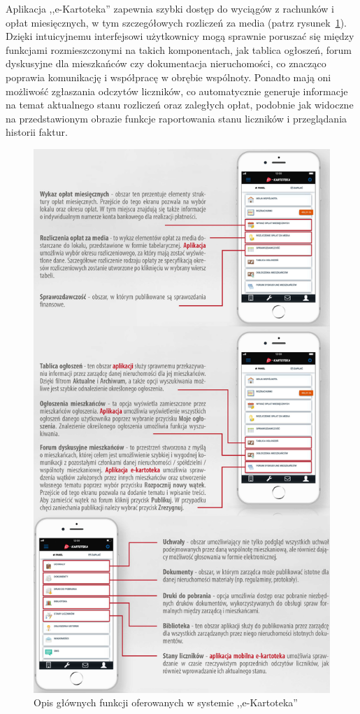 Aplikacja ,,e-Kartoteka'' zapewnia szybki dostęp do wyciągów z rachunków i opłat miesięcznych, w tym szczegółowych rozliczeń za media (patrz rysunek~\ref{fig:kartoteka_manual}). Dzięki intuicyjnemu interfejsowi użytkownicy mogą sprawnie poruszać się między funkcjami rozmieszczonymi na takich komponentach, jak tablica ogłoszeń, forum dyskusyjne dla mieszkańców czy dokumentacja nieruchomości, co znacząco poprawia komunikację i współpracę w obrębie wspólnoty. Ponadto mają oni możliwość zgłaszania odczytów liczników, co automatycznie generuje informacje na temat aktualnego stanu rozliczeń oraz zaległych opłat, podobnie jak widoczne na przedstawionym obrazie funkcje raportowania stanu liczników i przeglądania historii faktur.
\begin{figure}[ht]
    \centering
    \includegraphics[width=0.63\linewidth]{rys01/kartoteka_manual}
    \caption{Opis głównych funkcji oferowanych w systemie ,,e-Kartoteka''~\cite{e-kartoteka_manual}}
    \label{fig:kartoteka_manual}
\end{figure}

